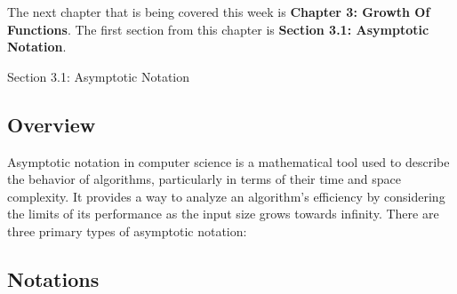 The next chapter that is being covered this week is \textbf{Chapter 3: Growth Of Functions}. The first section from this chapter is \textbf{Section 3.1: Asymptotic Notation}.

\begin{notes}{Section 3.1: Asymptotic Notation}
    \subsection*{Overview}

    Asymptotic notation in computer science is a mathematical tool used to describe the behavior of algorithms, particularly in terms of their time and space complexity. It provides a way to analyze 
    an algorithm's efficiency by considering the limits of its performance as the input size grows towards infinity. There are three primary types of asymptotic notation: \vspace*{1em}

    \subsection*{Notations}


\end{notes}
